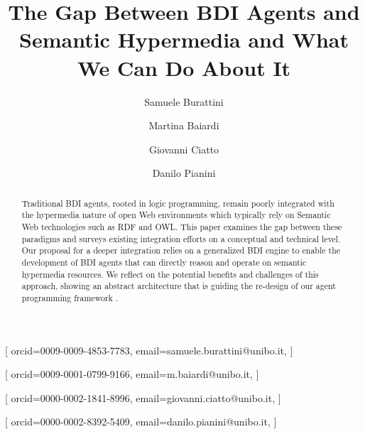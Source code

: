 \documentclass[
]{ceurart}
\begin{document}


\title{The Gap Between BDI Agents and Semantic Hypermedia and What We Can Do About It}


\author[1]{Samuele Burattini}[%
orcid=0009-0009-4853-7783,
email=samuele.burattini@unibo.it,
]
\cormark[1]
\fnmark[1]

\author[1]{Martina Baiardi}[%
orcid=0009-0001-0799-9166,
email=m.baiardi@unibo.it,
]
\fnmark[1]

\author[1]{Giovanni Ciatto}[%
orcid=0000-0002-1841-8996,
email=giovanni.ciatto@unibo.it,
]


\author[1]{Danilo Pianini}[%
orcid=0000-0002-8392-5409,
email=danilo.pianini@unibo.it,
]



\address[1]{\disi, \unibo}



\begin{abstract}
  Traditional BDI agents, 
  rooted in logic programming, 
  remain poorly integrated with the hypermedia nature of open Web environments
  which typically rely on Semantic Web technologies such as RDF and OWL.
  This paper examines the gap between these paradigms and surveys existing integration efforts on a conceptual and technical level.
  Our proposal for a deeper integration relies on a generalized BDI engine to enable the development of BDI agents that can directly reason and operate on semantic hypermedia resources.
  We reflect on the potential benefits and challenges of this approach, showing an abstract architecture that is guiding the re-design of our agent programming framework \jakta{}.
\end{abstract}
\end{document}
